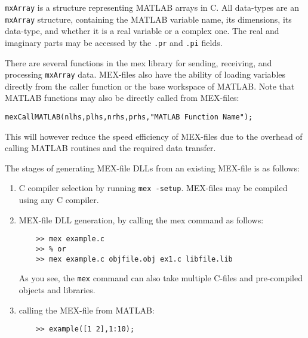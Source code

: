 \documentclass[10pt,a4paper]{article}
\newcounter{example}[section]
\begin{document}
\texttt{mxArray} is a structure representing MATLAB arrays in C. All data-types are an \texttt{mxArray} structure, containing the MATLAB variable name, its dimensions, its data-type, and whether it is a real variable or a complex one. The real and imaginary parts may be accessed by the \texttt{.pr} and \texttt{.pi} fields.

There are several functions in the mex library for sending, receiving, and processing \texttt{mxArray} data. MEX-files also have the ability of loading variables directly from the caller function or the base workspace of MATLAB. Note that MATLAB functions may also be directly called from MEX-files:
\begin{lstlisting}
mexCallMATLAB(nlhs,plhs,nrhs,prhs,"MATLAB Function Name");
\end{lstlisting}
This will however reduce the speed efficiency of MEX-files due to the overhead of calling MATLAB routines and the required data transfer.

The stages of generating MEX-file DLLs from an existing MEX-file is as follows:
\begin{enumerate}
\item C compiler selection by running \texttt{mex -setup}. MEX-files may be compiled using any C compiler. %
\item MEX-file DLL generation, by calling the mex command as follows:
\begin{lstlisting}
	>> mex example.c
	>> % or
	>> mex example.c objfile.obj ex1.c libfile.lib
\end{lstlisting}
As you see, the \texttt{mex} command can also take multiple C-files and pre-compiled objects and libraries.
\item calling the MEX-file from MATLAB:
\begin{lstlisting}
	>> example([1 2],1:10);
\end{lstlisting}
\end{enumerate}
\end{document}
